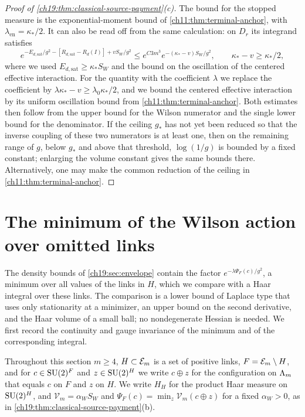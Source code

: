 \begin{proof}[Proof of \cref{ch19:thm:classical-source-payment}(c)]
The bound for the stopped measure is the exponential-moment bound of \cref{ch11:thm:terminal-anchor}, with $\lambda_{\mathrm{en}}=\kappa_*/2$. It can also be read off from the same calculation: on $D_r$ its integrand satisfies
\[
 e^{-E_{d,\mathrm{sat}}/g^2-[R_{d,\mathrm{sat}}-R_d(I)]+vS_W/g^2}\le e^{C3m^3}e^{-(\kappa_*-v)S_W/g^2},
 \qquad\kappa_*-v\ge\kappa_*/2,
\]
where we used $E_{d,\mathrm{sat}}\ge\kappa_*S_W$ and the bound on the oscillation of the centered effective interaction. For the quantity with the coefficient $\lambda$ we replace the coefficient by $\lambda\kappa_*-v\ge\lambda_0\kappa_*/2$, and we bound the centered effective interaction by its uniform oscillation bound from \cref{ch11:thm:terminal-anchor}. Both estimates then follow from the upper bound for the Wilson numerator and the single lower bound for the denominator. If the ceiling $g_*$ has not yet been reduced so that the inverse coupling of these two numerators is at least one, then on the remaining range of $g$, below $g_*$ and above that threshold, $\log(1/g)$ is bounded by a fixed constant; enlarging the volume constant gives the same bounds there. Alternatively, one may make the common reduction of the ceiling in \cref{ch11:thm:terminal-anchor}.
\end{proof}

\section{The minimum of the Wilson action over omitted links}\label{ch19:sec:completion}

The density bounds of \cref{ch19:sec:envelope} contain the factor $e^{-\lambda\Psi_F(c)/g^2}$, a minimum over all values of the links in $H$, which we compare with a Haar integral over these links. The comparison is a lower bound of Laplace type that uses only stationarity at a minimizer, an upper bound on the second derivative, and the Haar volume of a small ball; no nondegenerate Hessian is needed. We first record the continuity and gauge invariance of the minimum and of the corresponding integral.

Throughout this section $m\ge4$, $H\subset\mathcal E_{m}$ is a set of positive links, $F=\mathcal E_{m}\setminus H$, and for $c\in\mathrm{SU}(2)^F$ and $z\in\mathrm{SU}(2)^H$ we write $c\oplus z$ for the configuration on $\Lambda_{m}$ that equals $c$ on $F$ and $z$ on $H$. We write $H_H$ for the product Haar measure on $\mathrm{SU}(2)^H$, and $\mathcal V_m=\alpha_WS_W$ and $\Psi_F(c)=\min_z\mathcal V_m(c\oplus z)$ for a fixed $\alpha_W>0$, as in \cref{ch19:thm:classical-source-payment}(b).

